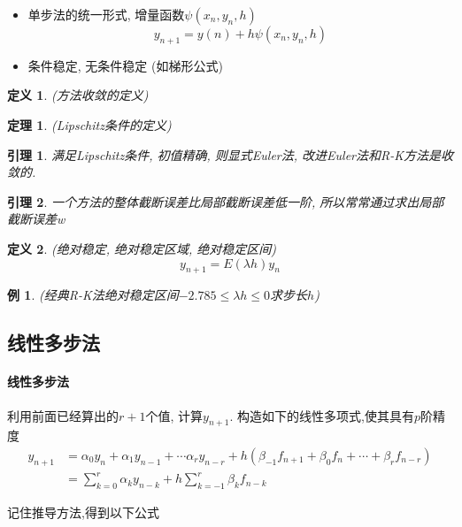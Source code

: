 \documentclass[twoside]{article}
\newtheorem{theorem}{定理}[section]
\newtheorem{lemma}{引理}[section]
\newtheorem{definition}{定义}[section]
\newtheorem{eg}{例}[section]
\begin{document}
\begin{itemize}
  \item 单步法的统一形式, 增量函数$\psi (x_n,y_n,h)$
    \begin{equation}
      y_{n+1} = y(n) + h \psi (x_n,y_n,h)
    \end{equation}
  \item 条件稳定, 无条件稳定 (如梯形公式)
\end{itemize}
\begin{definition}
  (方法收敛的定义)
\end{definition}
\begin{theorem}
  (Lipschitz条件的定义)
\end{theorem}
\begin{lemma}
  满足Lipschitz条件, 初值精确, 则显式Euler法, 改进Euler法和R-K方法是收敛的.
\end{lemma}
\begin{lemma}
  一个方法的整体截断误差比局部截断误差低一阶, 所以常常通过求出局部截断误差w
\end{lemma}
\begin{definition}
  (绝对稳定, 绝对稳定区域, 绝对稳定区间)
  \begin{equation}
    y_{n+1} = E (\lambda h) y_n
  \end{equation}
\end{definition}
\begin{eg}
  (经典R-K法绝对稳定区间$-2.785\le \lambda h \le 0$求步长$h$)
\end{eg}
\subsection{线性多步法}
\paragraph{线性多步法}
利用前面已经算出的$r+1$个值, 计算$y_{n+1}$. 构造如下的线性多项式,使其具有$p$阶精度
\begin{equation}
    \begin{aligned}
        y_{n+1} &=\alpha_0 y_n + \alpha_1 y_{n-1} + \cdots \alpha_r y_{n-r} + h(\beta_{-1}f_{n+1} + \beta_0 f_n + \cdots + \beta_r f_{n-r}) \\
        &= \sum^r_{k=0} \alpha_k y_{n-k} + h \sum^r_{k=-1} \beta_k f_{n-k}
    \end{aligned}
\end{equation}

记住推导方法,得到以下公式
\end{document}

